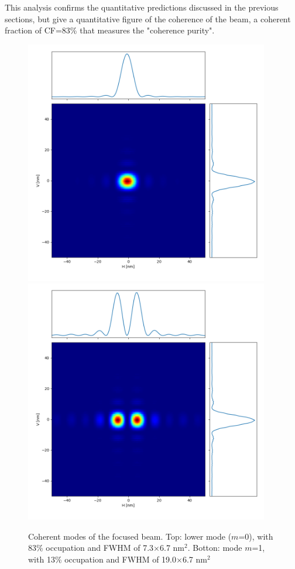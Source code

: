 \documentclass{iucr}              %
\begin{document}
This analysis confirms the quantitative predictions discussed in the previous sections, but give a quantitative figure of the coherence of the beam, a  coherent fraction of CF=83\% that measures the "coherence purity".


 




\begin{figure}\label{fig:final modes}
    \centering
        \includegraphics[width=0.95\textwidth]{GRAPHICS/final_mode0.png}
        \includegraphics[width=0.95\textwidth]{GRAPHICS/final_mode1.png}
    \caption{Coherent modes of the focused beam. Top: lower mode ($m$=0), with 83\% occupation and FWHM of 7.3$\times$6.7 nm$^2$. Botton: mode $m$=1, with 13\% occupation and FWHM of 19.0$\times$6.7 nm$^2$}
\end{figure}
\end{document}
